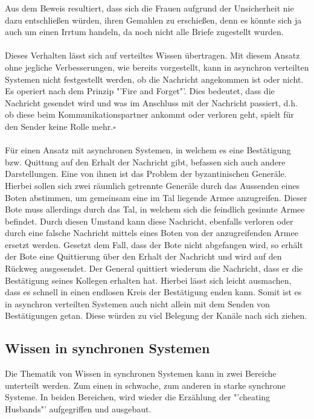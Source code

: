 Aus dem Beweis resultiert, dass sich die Frauen aufgrund der Unsicherheit nie dazu entschließen würden, ihren Gemahlen zu erschießen, denn es könnte sich ja auch um einen Irrtum handeln, da noch nicht alle Briefe zugestellt wurden.\\\\
Dieses Verhalten lässt sich auf verteiltes Wissen übertragen. Mit diesem Ansatz ohne jegliche Verbesserungen, wie bereits vorgestellt, kann in asynchron verteilten Systemen nicht festgestellt werden, ob die Nachricht angekommen ist oder nicht. Es operiert nach dem Prinzip "'Fire and Forget"'. Dies bedeutet, dass die Nachricht gesendet wird und was im Anschluss mit der Nachricht passiert, d.h. ob diese beim Kommunikationspartner ankommt oder verloren geht, spielt für den Sender keine Rolle mehr.$\square$\\\\
Für einen Ansatz mit asynchronen Systemen, in welchem es eine Bestätigung bzw. Quittung auf den Erhalt der Nachricht gibt, befassen sich auch andere Darstellungen. Eine von ihnen ist das Problem der byzantinischen Generäle. Hierbei sollen sich zwei räumlich getrennte Generäle durch das Aussenden eines Boten abstimmen, um gemeinsam eine im Tal liegende Armee anzugreifen. Dieser Bote muss allerdings durch das Tal, in welchem sich die feindlich gesinnte Armee befindet. Durch diesen Umstand kann diese Nachricht, ebenfalls verloren oder durch eine falsche Nachricht mittels eines Boten von der anzugreifenden Armee ersetzt werden. Gesetzt dem Fall, dass der Bote nicht abgefangen wird, so erhält der Bote eine Quittierung über den Erhalt der Nachricht und wird auf den Rückweg ausgesendet. Der General quittiert wiederum die Nachricht, dass er die Bestätigung seines Kollegen erhalten hat. Hierbei lässt sich leicht ausmachen, dass es schnell in einen endlosen Kreis der Bestätigung enden kann. Somit ist es in asynchron verteilten Systemen auch nicht allein mit dem Senden von Bestätigungen getan. Diese würden zu viel Belegung der Kanäle nach sich ziehen.



\subsection{Wissen in synchronen Systemen}
\label{wissen_sync}
Die Thematik von Wissen in synchronen Systemen kann in zwei Bereiche unterteilt werden. Zum einen in schwache, zum anderen in starke synchrone Systeme. In beiden Bereichen, wird wieder die Erzählung der "'cheating Husbands"' aufgegriffen und ausgebaut.
